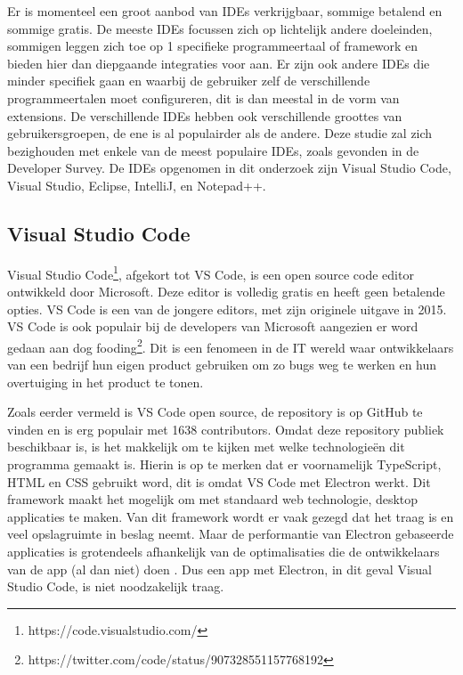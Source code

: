 Er is momenteel een groot aanbod van IDEs verkrijgbaar, sommige betalend en sommige gratis. De meeste IDEs focussen zich op lichtelijk andere doeleinden, sommigen leggen zich toe op 1 specifieke programmeertaal of framework en bieden hier dan diepgaande integraties voor aan. Er zijn ook andere IDEs die minder specifiek gaan en waarbij de gebruiker zelf de verschillende programmeertalen moet configureren, dit is dan meestal in de vorm van extensions. De verschillende IDEs hebben ook verschillende groottes van gebruikersgroepen, de ene is al populairder als de andere. Deze studie zal zich bezighouden met enkele van de meest populaire IDEs, zoals gevonden in de \textcite{StackOverflow2021} Developer Survey. De IDEs opgenomen in dit onderzoek zijn Visual Studio Code, Visual Studio, Eclipse, IntelliJ, en Notepad++.

\subsection{Visual Studio Code}

Visual Studio Code\footnote{https://code.visualstudio.com/}, afgekort tot VS Code, is een open source code editor ontwikkeld door Microsoft. Deze editor is volledig gratis en heeft geen betalende opties. VS Code is een van de jongere editors, met zijn originele uitgave in 2015. VS Code is ook populair bij de developers van Microsoft aangezien er word gedaan aan dog fooding\footnote{https://twitter.com/code/status/907328551157768192}. Dit is een fenomeen in de IT wereld waar ontwikkelaars van een bedrijf hun eigen product gebruiken om zo bugs weg te werken en hun overtuiging in het product te tonen.

Zoals eerder vermeld is VS Code open source, de repository is op GitHub te vinden en is erg populair met 1638 contributors. Omdat deze repository publiek beschikbaar is, is het makkelijk om te kijken met welke technologieën dit programma gemaakt is. Hierin is op te merken dat er voornamelijk TypeScript, HTML en CSS gebruikt word, dit is omdat VS Code met Electron werkt. Dit framework maakt het mogelijk om met standaard web technologie, desktop applicaties te maken. Van dit framework wordt er vaak gezegd dat het traag is en veel opslagruimte in beslag neemt. Maar de performantie van Electron gebaseerde applicaties is grotendeels afhankelijk van de optimalisaties die de ontwikkelaars van de app (al dan niet) doen \autocite{Leenheer2021}. Dus een app met Electron, in dit geval Visual Studio Code, is niet noodzakelijk traag. 

